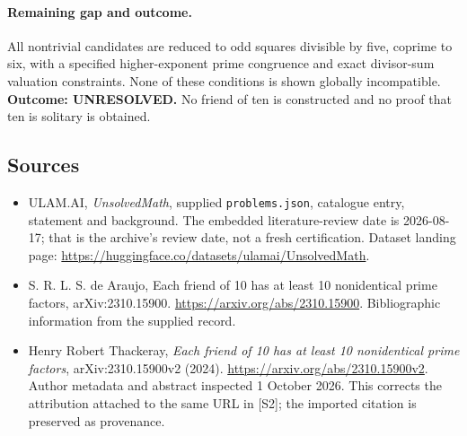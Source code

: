 \documentclass[11pt,a4paper]{article}
\begin{document}
\paragraph{Remaining gap and outcome.}
All nontrivial candidates are reduced to odd squares divisible by five,
coprime to six, with a specified higher-exponent prime congruence and
exact divisor-sum valuation constraints. None of these conditions is
shown globally incompatible. \textbf{Outcome: UNRESOLVED.} No friend
of ten is constructed and no proof that ten is solitary is obtained.

\subsection{Sources}

{\small

\begin{itemize}

\item[\hypertarget{source:statement:1}{S1}] ULAM.AI, \emph{UnsolvedMath}, supplied \texttt{problems.json}, catalogue entry, statement and background. The embedded literature-review date is 2026-08-17; that is the archive’s review date, not a fresh certification. Dataset landing page: \url{https://huggingface.co/datasets/ulamai/UnsolvedMath}.

\item[\hypertarget{source:statement:2}{S2}] S. R. L. S. de Araujo, Each friend of 10 has at least 10 nonidentical prime factors, arXiv:2310.15900. \url{https://arxiv.org/abs/2310.15900}. Bibliographic information from the supplied record.


\item[E1] Henry Robert Thackeray, \emph{Each friend of 10 has at
least 10 nonidentical prime factors}, arXiv:2310.15900v2 (2024).
\url{https://arxiv.org/abs/2310.15900v2}. Author metadata and abstract
inspected 1 October 2026. This corrects the attribution attached to the
same URL in [S2]; the imported citation is preserved as provenance.

\end{itemize}

}

\label{end:statement}
\end{document}
